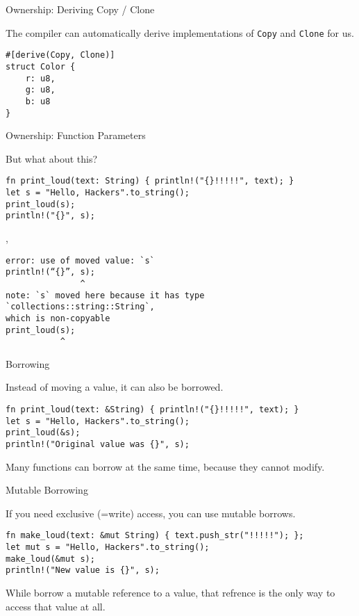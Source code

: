 
\begin{frame}[fragile]{Ownership: Deriving Copy / Clone}

The compiler can automatically derive implementations of \texttt{Copy} and
\texttt{Clone} for us.

\begin{verbatim}
#[derive(Copy, Clone)]
struct Color {
    r: u8,
    g: u8,
    b: u8
}
\end{verbatim}

\end{frame}


\begin{frame}[fragile]{Ownership: Function Parameters}

But what about this?

\begin{verbatim}
fn print_loud(text: String) { println!("{}!!!!!", text); }
let s = "Hello, Hackers".to_string();
print_loud(s);
println!("{}", s);
\end{verbatim}

\pause
\sep

\begin{verbatim}
error: use of moved value: `s`
println!(“{}”, s);
               ^
note: `s` moved here because it has type `collections::string::String`,
which is non-copyable
print_loud(s);
           ^
\end{verbatim}

\end{frame}


\begin{frame}[fragile]{Borrowing}

Instead of moving a value, it can also be borrowed.

\begin{verbatim}
fn print_loud(text: &String) { println!("{}!!!!!", text); }
let s = "Hello, Hackers".to_string();
print_loud(&s);
println!("Original value was {}", s);
\end{verbatim}

Many functions can borrow at the same time, because they cannot modify.

\end{frame}


\begin{frame}[fragile]{Mutable Borrowing}

If you need exclusive (=write) access, you can use mutable borrows.

\begin{verbatim}
fn make_loud(text: &mut String) { text.push_str("!!!!!"); };
let mut s = "Hello, Hackers".to_string();
make_loud(&mut s);
println!("New value is {}", s);
\end{verbatim}

While borrow a mutable reference to a value, that refrence is the only way to
access that value at all.
\end{frame}

